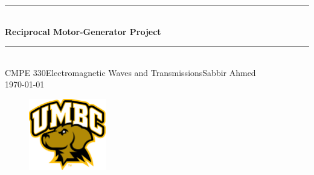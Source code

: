 \begin{titlepage}

    \newcommand{\HRule}{\rule{\linewidth}{0.6mm}}

    \center

    \HRule \\[1.5cm]
    {\huge \bfseries Reciprocal Motor-Generator Project}\\[0.5cm]
    \HRule \\[4.5cm]

    \large{CMPE 330\linebreak Electromagnetic Waves and Transmissions\linebreak Sabbir Ahmed}\\[3cm]

    {\large \today}\\[2cm]

    \begin{figure}[h]
        \begin{center}
            \includegraphics[width=0.3\textwidth]{figures/uni_logo.jpg}
            \label{fig:uni_logo}
        \end{center}
    \end{figure}

    \vfill %

\end{titlepage}
